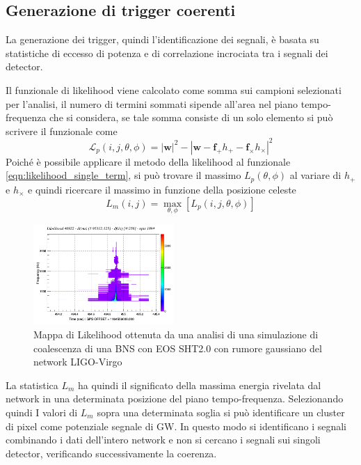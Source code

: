 \subsection{Generazione di trigger coerenti}
\label{section:coherent_trigger}
La generazione dei trigger, quindi l'identificazione dei segnali, è basata su statistiche di eccesso di potenza e di correlazione incrociata tra i segnali dei detector. 

Il funzionale di likelihood viene calcolato come somma sui campioni selezionati per l'analisi, il numero di termini sommati sipende all'area nel piano tempo-frequenza che si considera, se tale somma consiste di un solo elemento si può scrivere il funzionale come
\begin{equation}
	\mathcal{L}_p(i,j,\theta,\phi)=|\textbf{w}|^2 -|\textbf{w} - \textbf{f}_+h_+ - \textbf{f}_\times h_\times|^2
	\label{eqn:likelihood_single_term}
\end{equation}
Poiché è possibile applicare il metodo della likelihood al funzionale \ref{eqn:likelihood_single_term}, si può trovare il massimo $L_p(\theta, \phi)$ al variare di $h_+$ e $h_\times$ e quindi ricercare il massimo in funzione della posizione celeste
\begin{equation}
	L_m(i,j)= \max_{\theta, \phi}[L_p(i,j,\theta,\phi)]
	\label{eqn:max_L}
\end{equation}
\begin{figure}
	\vspace{-20pt}
	\begin{center}
		\includegraphics[width=0.475\textwidth]{figures/Capitolo_3/l_tfmap_scalogram.png}
	\end{center}
	\vspace{-5pt}
	\caption{Mappa di Likelihood ottenuta da una analisi di una simulazione di coalescenza di una BNS con EOS SHT2.0 con rumore gaussiano del network LIGO-Virgo}
	\label{fig:Likelihood_example}
	\vspace{-10pt}
\end{figure}
La statistica $L_m$ ha quindi il significato della massima energia rivelata dal network in una determinata posizione del piano tempo-frequenza. Selezionando quindi I valori di $L_m$ sopra una determinata soglia si può identificare un cluster di pixel come potenziale segnale di GW. In questo modo si identificano i segnali combinando i dati dell'intero network e non si cercano i segnali sui singoli detector, verificando successivamente la coerenza.
